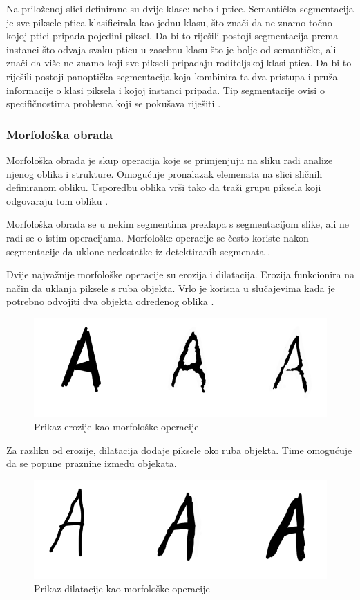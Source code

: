 \documentclass{foi}
\begin{document}
Na priloženoj slici definirane su dvije klase: nebo i ptice. Semantička segmentacija je sve piksele ptica klasificirala kao jednu klasu, što znači da ne znamo točno kojoj ptici pripada pojedini piksel. Da bi to riješili postoji segmentacija prema instanci što odvaja svaku pticu u zasebnu klasu što je bolje od semantičke, ali znači da više ne znamo koji sve pikseli pripadaju roditeljskoj klasi ptica. Da bi to riješili postoji panoptička segmentacija koja kombinira ta dva pristupa i pruža informacije o klasi piksela i kojoj instanci pripada. Tip segmentacije ovisi o specifičnostima problema koji se pokušava riješiti \cite{segmentacija}.


\subsubsection{Morfološka obrada}

Morfološka obrada je skup operacija koje se primjenjuju na sliku radi analize njenog oblika i strukture. Omogućuje pronalazak elemenata na slici sličnih definiranom obliku. Usporedbu oblika vrši tako da traži grupu piksela koji odgovaraju tom obliku \cite{morph}.

Morfološka obrada se u nekim segmentima preklapa s segmentacijom slike, ali ne radi se o istim operacijama. Morfološke operacije se često koriste nakon segmentacije da uklone nedostatke iz detektiranih segmenata \cite{morph}.

Dvije najvažnije morfološke operacije su erozija i dilatacija.
Erozija funkcionira na način da uklanja piksele s ruba objekta. Vrlo je korisna u slučajevima kada je potrebno odvojiti dva objekta određenog oblika \cite{morph}. 

\begin{figure}[H]
    \centering
    \includegraphics[width=0.75\linewidth]{slike/erosion.png}
    \caption{Prikaz erozije kao morfološke operacije \cite{morph}}
\end{figure}

Za razliku od erozije, dilatacija dodaje piksele oko ruba objekta. Time omogućuje da se popune praznine između objekata.

\begin{figure}[H]
    \centering
    \includegraphics[width=0.75\linewidth]{slike/dilatacija.png}
    \caption{Prikaz dilatacije kao morfološke operacije \cite{morph}}
\end{figure}
\end{document}
